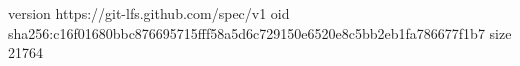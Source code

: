 version https://git-lfs.github.com/spec/v1
oid sha256:c16f01680bbc876695715fff58a5d6c729150e6520e8c5bb2eb1fa786677f1b7
size 21764
